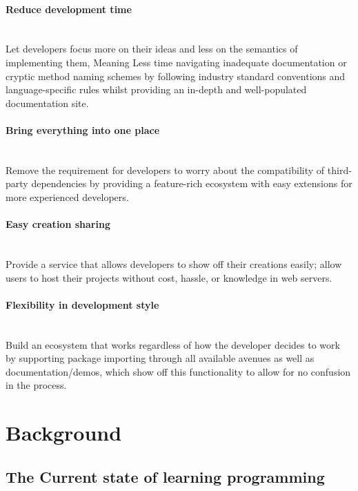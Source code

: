 \documentclass{l4proj}
\begin{document}
\subsubsection{Reduce development time} \hfill\\
\text Let developers focus more on their ideas and less on the semantics of implementing them, Meaning Less time navigating inadequate documentation or cryptic method naming schemes by following industry standard conventions and language-specific rules whilst providing an in-depth and well-populated documentation site.
\\
\subsubsection{Bring everything into one place} \hfill\\
\text Remove the requirement for developers to worry about the compatibility of third-party dependencies by providing a feature-rich ecosystem with easy extensions for more experienced developers.
\\
\subsubsection{Easy creation sharing}\hfill\\
\text Provide a service that allows developers to show off their creations easily; allow users to host their projects without cost, hassle, or knowledge in web servers.
\\
\subsubsection{Flexibility in development style}\hfill\\
\text Build an ecosystem that works regardless of how the developer decides to work by supporting package importing through all available avenues as well as documentation/demos, which show off this functionality to allow for no confusion in the process.


\chapter{Background}

\section{The Current state of learning programming}
\end{document}
